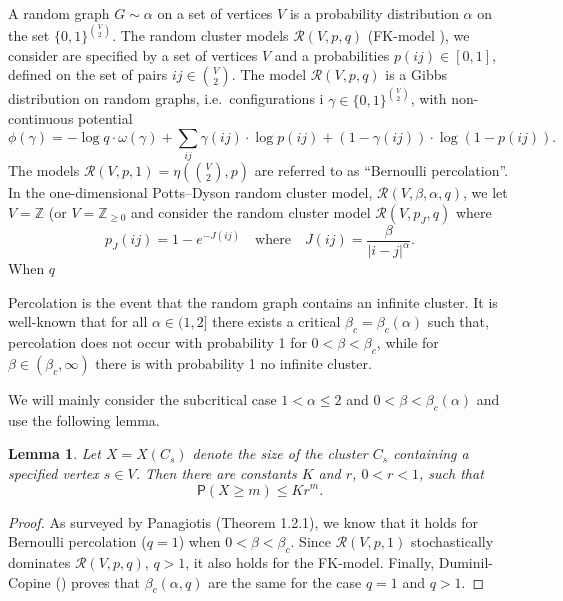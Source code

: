 \documentclass[11pt, a4paper]{amsart}
\newtheorem{lem}[thm]{Lemma}
\theoremstyle{definition}
\theoremstyle{remark}
\providecommand{\ZZ}{\mathbb{Z}}
\providecommand{\mscr}{\mathscr}
\renewcommand{\P}{\mathsf{P}}
\providecommand{\w}{\omega}
\begin{document}
A random graph $G\sim\alpha$ on a set of vertices $V$ is a probability
distribution $\alpha$ on the set $\{0,1\}^{\binom V2}$. The random cluster
models $\mscr R(V,p,q)$ (FK-model \cite{grimmet}), we consider are specified by a set 
of vertices $V$ and a probabilities $p(ij)\in[0,1]$, defined on the set of pairs
$ij\in \binom V2$. The model $\mscr R(V,p,q)$ is a Gibbs distribution on random
graphs, i.e.\ configurations i $\gamma\in\{0,1\}^{\binom V2}$, with 
non-continuous potential
$$
\phi(\gamma) = 
- \log q \cdot\w(\gamma) + 
\sum_{ij}\gamma(ij)\cdot \log p(ij) + (1-\gamma(ij))\cdot\log (1-p(ij)).
$$
The models $\mscr R(V,p,1)=\eta(\binom V2,p)$ 
are referred to as ``Bernoulli percolation''. 
In the one-dimensional Potts--Dyson random cluster model, 
$\mscr R(V,\beta,\alpha,q)$,
we let $V=\ZZ$ (or $V=\ZZ_{\ge0}$ and consider the random cluster model 
$\mscr R(V,p_J,q)$ where 
\begin{equation}\label{eq:Jdef}
  p_J(ij) = 1-e^{-J(ij)} \quad\text{where}\quad 
  J({ij}) = \frac \beta{|i-j|^\alpha}.
\end{equation}
When $q$

Percolation is the event that the random graph contains an infinite cluster. 
It is well-known \cite{ACCN} that for all $\alpha\in(1,2]$
there exists a critical $\beta_c=\beta_c(\alpha)$ 
such that, percolation does not occur with probability 1 for $0<\beta<\beta_c$, 
while for $\beta\in(\beta_c,\infty)$ there is with probability 1
no infinite cluster.     

We will mainly consider the subcritical case $1<\alpha\le 2$ and $0<\beta <\beta_c(\alpha)$ and use the following lemma. 
\begin{lem}\label{geometric-bound}
 Let $X=X(C_s)$ denote the size of the cluster $C_s$ 
 containing a specified vertex $s\in V$. Then there are constants 
 $K$ and $r$, $0<r<1$, such that $$\P(X\ge m)\le K r^{m}. $$ 
\end{lem}
\begin{proof}
  As surveyed by Panagiotis \cite{panagiotis} (Theorem 1.2.1), we know that it
  holds for Bernoulli percolation ($q=1$) when $0<\beta<\beta_c$. Since $\mscr R(V,p,1)$
  stochastically dominates $\mscr R(V,p,q)$, $q>1$, it also holds for the
  FK-model. Finally, Duminil-Copine (\cite{duminil}) proves that $\beta_c(\alpha,q)$ are
  the same for the case $q=1$ and $q>1$.
\end{proof}
\end{document}
